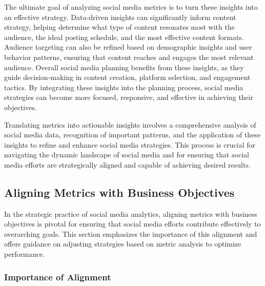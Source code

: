 \documentclass[
]{book}
\begin{document}
The ultimate goal of analyzing social media metrics is to turn these insights into an effective strategy. Data-driven insights can significantly inform content strategy, helping determine what type of content resonates most with the audience, the ideal posting schedule, and the most effective content formats. Audience targeting can also be refined based on demographic insights and user behavior patterns, ensuring that content reaches and engages the most relevant audience. Overall social media planning benefits from these insights, as they guide decision-making in content creation, platform selection, and engagement tactics. By integrating these insights into the planning process, social media strategies can become more focused, responsive, and effective in achieving their objectives.

Translating metrics into actionable insights involves a comprehensive analysis of social media data, recognition of important patterns, and the application of these insights to refine and enhance social media strategies. This process is crucial for navigating the dynamic landscape of social media and for ensuring that social media efforts are strategically aligned and capable of achieving desired results.

\hypertarget{aligning-metrics-with-business-objectives}{%
\subsection*{Aligning Metrics with Business Objectives}\label{aligning-metrics-with-business-objectives}}

In the strategic practice of social media analytics, aligning metrics with business objectives is pivotal for ensuring that social media efforts contribute effectively to overarching goals. This section emphasizes the importance of this alignment and offers guidance on adjusting strategies based on metric analysis to optimize performance.

\hypertarget{importance-of-alignment}{%
\subsubsection*{Importance of Alignment}\label{importance-of-alignment}}
\end{document}
